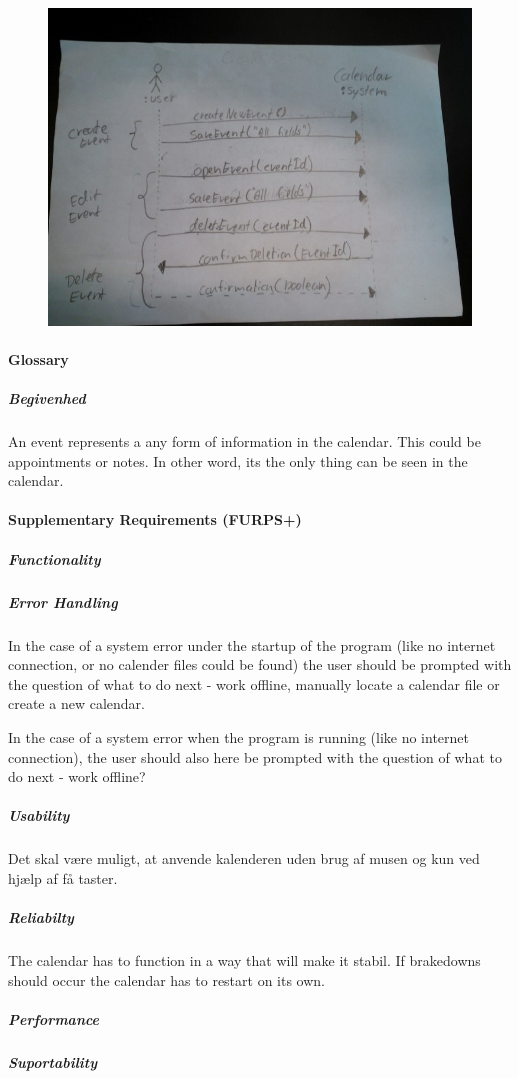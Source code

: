 \documentclass{article}
\begin{document}
	\begin{figure}[h]
	\caption{}   
   	\hspace{-50pt}
   	\includegraphics[scale=.65]{LatexFiles/Analyze/SystemSequenceDiagram/SSD}
   	\end{figure}
\newpage
	   \mbox{}
	\newpage
   \paragraph{Glossary} \mbox{}
\subparagraph{Begivenhed} \mbox{}

An event represents a any form of information in the calendar. This could be appointments or notes. In other word, its the only thing can be seen in the calendar. \\
   
   \paragraph{Supplementary Requirements (FURPS+)} \mbox{}
   \subparagraph{Functionality} \mbox{}
   
   \subparagraph{Error Handling} \mbox{}
   
   In the case of a system error under the startup of the program (like no internet connection, or no calender files could be found) the user should be prompted with the question of what to do next - work offline, manually locate a calendar file or create a new calendar. \linebreak
   
   In the case of a system error when the program is running (like no internet connection), the user should also here be prompted with the question of what to do next - work offline?
   \subparagraph{Usability} \mbox{}
   
   Det skal være muligt, at anvende kalenderen uden brug af musen og kun ved hjælp af få taster.
   \subparagraph{Reliabilty} \mbox{}
   
   The calendar has to function in a way that will make it stabil. If brakedowns should occur the calendar has to restart on its own. 
   
   \subparagraph{Performance} \mbox{}
   
   
   \subparagraph{Suportability} \mbox{}
   
   
   
   
  
\end{document}
